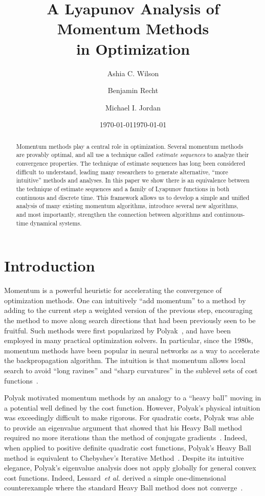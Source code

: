 \documentclass[11pt]{article}
\theoremstyle{plain}
\begin{document}
\title{A Lyapunov Analysis of Momentum Methods \\ in  Optimization}
\date{\today}
\author{Ashia C. Wilson \and Benjamin Recht \and Michael I. Jordan}
\date{\today}
\maketitle
\begin{abstract}
Momentum methods play a central role in optimization. Several momentum methods are provably optimal, and all use a technique called {\em estimate sequences} to analyze their convergence properties.  The technique of estimate sequences has long been considered difficult to understand, leading many researchers to generate alternative, ``more intuitive'' methods and analyses. In this paper we show there is an equivalence between the technique of estimate sequences and a family of Lyapunov functions in both continuous and discrete time. This framework allows us to develop a simple and unified analysis of many existing momentum algorithms, introduce several new algorithms, and most importantly, strengthen the connection between algorithms and continuous-time dynamical systems. 
\end{abstract}

\section{Introduction}

Momentum is a powerful heuristic for accelerating the convergence of optimization methods.    One can intuitively ``add momentum'' to a method by adding to the current step a weighted version of the previous step, encouraging the method to move along search directions that had been previously seen to be fruitful.  Such methods were first popularized by Polyak~\cite{Polyak1964}, and have been employed in many practical optimization solvers.  In particular, since the 1980s, momentum methods have been popular in neural networks as a way to accelerate the backpropagation algorithm.  The intuition is that momentum allows local search to avoid ``long ravines'' and ``sharp curvatures'' in the sublevel sets of cost functions~\cite{Rumelhardt}.

Polyak motivated momentum methods by an analogy to a ``heavy ball'' moving in a potential well defined by the cost function.  However, Polyak's physical intuition was exceedingly difficult to make rigorous.  For quadratic costs, Polyak was able to provide an eigenvalue argument that showed that his Heavy Ball method required no more iterations than the method of conjugate gradients~\cite{Polyak1964}.  
Indeed, when applied to positive definite quadratic cost functions, Polyak's Heavy Ball method is equivalent to Chebyshev's Iterative Method~\cite{Chebyshev}.   Despite its intuitive elegance, Polyak's eigenvalue analysis does not apply globally for general convex cost functions. Indeed, Lessard~\emph{et al.} derived a simple one-dimensional counterexample where the standard Heavy Ball method does not converge~\cite{Lessard14}.  
\end{document}
